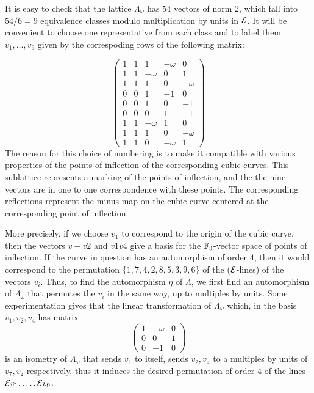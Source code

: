 It is easy to check that the lattice $\Lambda_\omega$ has $54$ vectors of norm $2$,
which fall into $54/6 = 9$ equivalence classes modulo multiplication by units in
${ \mathcal E }$. It will be convenient to choose one representative from each class and to label
them $v_1,\dots ,v_9$ given by the correspoding rows of the following matrix:

\begin{equation} \label{eq-roots} \left(\begin{array}{ccccc}1 & 1 & 1 & -\omega & 0 \\1
& 1 & -\omega & 0 & 1 \\1 & 1 & 1 & 0 & -\omega \\0 & 0 & 1 & -1 & 0 \\0 & 0 & 1 & 0 &
-1 \\0 & 0 & 0 & 1 & -1 \\1 & 1 & -\omega & 1 & 0 \\1 & 1 & 1 & 0 & -\omega \\1 & 1 & 0
& -\omega & 1\end{array}\right) \end{equation} The reason for this choice of numbering
is to make it compatible with various properties of the points of inflection of the
corresponding cubic curves. This sublattice represents a marking of the points of
inflection, and the the nine vectors are in one to one correspondence with these
points. The corresponding reflections represent the minus map on the cubic curve
centered at the corresponding point of inflection.

More precisely, if we choose $v_1$ to correspond to the origin of the cubic curve, then
the vectors $v-v2$ and $v1v4$ give a basis for the ${ \mathbb F }_3$-vector space of points of
inflection. If the curve in question has an automorphism of order $4$, then it would
correspond to the permutation $\{1,7,4,2,8,5,3,9,6\}$ of the (${ \mathcal E }$-lines) of the
vectors $v_i$. Thus, to find the automorphism $\eta$ of $\Lambda$, we first find an
automorphism of $\Lambda_\omega$ that permutes the $v_i$ in the same way, up to
multiples by units. Some experimentation gives that the linear transformation of
$\Lambda_\omega$ which, in the basis $v_1,v_2,v_4$ has matrix \begin{equation}
\label{eq-orderfour} \left(\begin{array}{ccc}1 & -\omega & 0 \\0 & 0 & 1 \\0 & -1 &
0\end{array}\right) \end{equation} is an isometry of $\Lambda_\omega$ that sends $v_1$
to itself, sends $v_2, v_4$ to a multiples by units of $v_7, v_2$ respectively, thus it
induces the desired permutation of order $4$ of the lines ${ \mathcal E } v_1,\dots,{ \mathcal E } v_9$.

